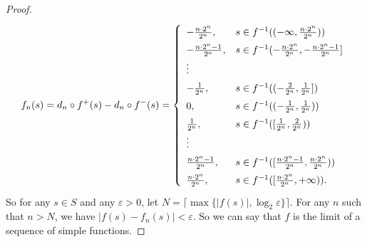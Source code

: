 \documentclass[a4paper, linespread=1.5]{article}
\begin{document}
\begin{proof}
        \begin{align*}
            f_n(s) = d_n \circ f^+(s) - d_n \circ f^-(s) = \left\{
            \def\arraystretch{1.5}
            \begin{array}{ll}
                -\frac{n \cdot 2^n}{2^n}, & s \in f^{-1}((-\infty, \frac{n \cdot 2^n}{2^n})) \\
                -\frac{n \cdot 2^n - 1}{2^n}, & s \in f^{-1}(-\frac{n \cdot 2^n}{2^n}, -\frac{n \cdot 2^n - 1}{2^n}] \\
                \vdots & \\
                -\frac{1}{2^n}, & s \in f^{-1}((-\frac{2}{2^n}, \frac{1}{2^n}]) \\
                0, & s \in f^{-1}((-\frac{1}{2^n}, \frac{1}{2^n})) \\
                \frac{1}{2^n}, & s \in f^{-1}([\frac{1}{2^n},  \frac{2}{2^n})) \\
                \vdots & \\
                \frac{n \cdot 2^n - 1}{2^n}, & s \in f^{-1}([\frac{n \cdot 2^n - 1}{2^n}, \frac{n \cdot 2^n}{2^n})) \\
                \frac{n \cdot 2^n}{2^n}, & s \in f^{-1}([\frac{n \cdot 2^n}{2^n}, +\infty)).
            \end{array}
            \right.
        \end{align*}
        So for any $s \in S$ and any $\varepsilon > 0$, let $N = \lceil\max\{|f(s)|, \log_{2}\varepsilon\}\rceil$. For any $n$ such that $n > N$, we have $|f(s) - f_n(s)| < \varepsilon$. So we can say that $f$ is the limit of a sequence of simple functions.
    \end{proof}
\end{document}
